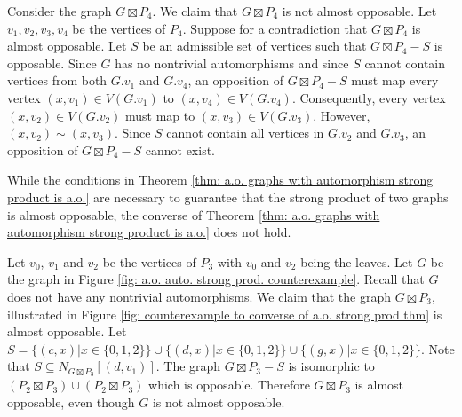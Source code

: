 \documentclass[11pt]{article}
\theoremstyle{definition}
\begin{document}
Consider the graph $G\boxtimes P_4$. We claim that $G\boxtimes P_4$ is not
almost opposable. Let $v_1, v_2, v_3, v_4$ be the vertices of $P_4$. Suppose
for a contradiction that $G\boxtimes P_4$ is almost opposable. Let $S$ be an
admissible set of vertices such that $G\boxtimes P_4 - S$ is opposable. Since
$G$ has no nontrivial automorphisms and since $S$ cannot contain vertices from
both $G.v_1$ and $G.v_4$, an opposition of $G\boxtimes P_4 - S$ must map every
vertex $(x,v_1)\in V(G.v_1)$ to $(x,v_4)\in V(G.v_4)$. Consequently, every
vertex $(x,v_2)\in V(G.v_2)$ must map to $(x,v_3)\in V(G.v_3)$. However,
$(x,v_2) \sim (x, v_3)$. Since $S$ cannot contain all vertices in $G.v_2$ and
$G.v_3$, an opposition of $G\boxtimes P_4 - S$ cannot exist.

While the conditions in Theorem \ref{thm: a.o. graphs with automorphism strong
product is a.o.} are necessary to guarantee that the strong product of two
graphs is almost opposable, the converse of Theorem \ref{thm: a.o. graphs with
automorphism strong product is a.o.} does not hold. 

Let $v_0$, $v_1$ and $v_2$ be the vertices of $P_3$ with $v_0$ and $v_2$ being
the leaves. Let $G$ be the graph in Figure \ref{fig: a.o. auto. strong prod.
counterexample}. Recall that $G$ does not have any nontrivial automorphisms. We
claim that the graph $G\boxtimes P_3$, illustrated in Figure \ref{fig:
counterexample to converse of a.o. strong prod thm} is almost opposable. Let $S
= \{ (c,x) | x\in \{0,1,2\} \} \cup \{ (d,x) | x\in \{0,1,2\} \} \cup \{ (g,x)
| x\in \{0,1,2\} \}$. Note that $S\subseteq N_{G\boxtimes P_3}[(d,v_1)]$. The
graph $G\boxtimes P_3 - S$ is isomorphic to $(P_2 \boxtimes P_3) \cup (P_2
\boxtimes P_3)$ which is opposable. Therefore $G\boxtimes P_3$ is almost
opposable, even though $G$ is not almost opposable. 
\end{document}
